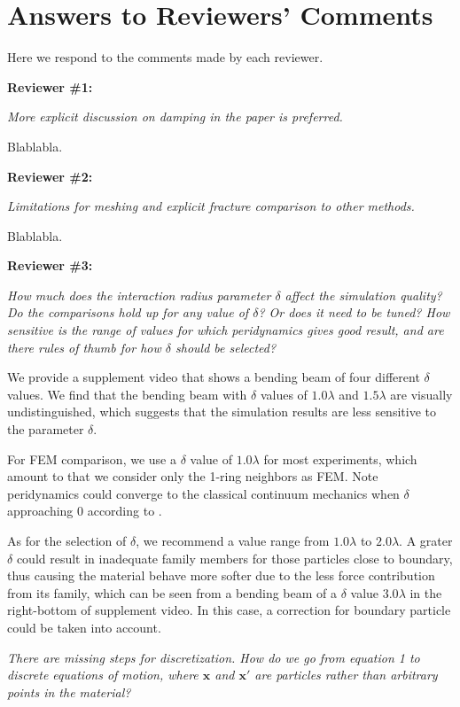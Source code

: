 \section{Answers to Reviewers' Comments}

Here we respond to the comments made by each reviewer.

\noindent{}\textbf{Reviewer \#1:}

\emph{More explicit discussion on damping in the paper is preferred.}

Blablabla.

\noindent{}\textbf{Reviewer \#2:}

\emph{Limitations for meshing and explicit fracture comparison to other methods.}

Blablabla.

\noindent{}\textbf{Reviewer \#3:}

\emph{How much does the interaction radius parameter $\delta$ affect the simulation quality? Do the comparisons hold up for any value of $\delta$? Or does it need to be tuned? How sensitive is the range of values for which peridynamics gives good result, and are there rules of thumb for how $\delta$ should be selected?}

We provide a supplement video that shows a bending beam of four different $\delta$ values. We find that the bending beam with $\delta$ values of $1.0\lambda$ and $1.5\lambda$ are visually undistinguished, which suggests that the simulation results are less sensitive to the parameter $\delta$.

For FEM comparison, we use a $\delta$ value of $1.0\lambda$ for most experiments, which amount to that we consider only the 1-ring neighbors as FEM. Note peridynamics could converge to the classical continuum mechanics when $\delta$ approaching 0 according to \cite{Weckner2005705}.

As for the selection of $\delta$, we recommend a value range from $1.0\lambda$ to $2.0\lambda$.
A grater $\delta$ could result in inadequate family members for those particles close to boundary, thus causing the material behave more softer due to the less force contribution from its family, which can be seen from a bending beam of a $\delta$ value $3.0\lambda$ in the right-bottom of supplement video.
In this case, a correction for boundary particle could be taken into account.

\emph{There are missing steps for discretization. How do we go from equation 1 to discrete equations of motion, where $\mathbf{x}$ and $\mathbf{x'}$ are particles rather than arbitrary points in the material? }

